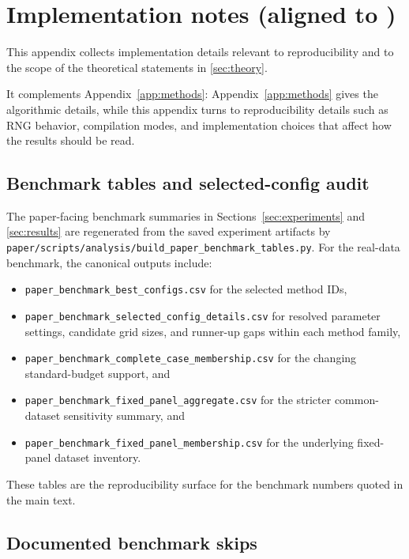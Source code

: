 \section{Implementation notes (aligned to \citrees)}
\label{app:implementation}

This appendix collects implementation details relevant to reproducibility and
to the scope of the theoretical statements in \cref{sec:theory}.

It complements Appendix~\ref{app:methods}: Appendix~\ref{app:methods} gives
the algorithmic details, while this appendix turns to reproducibility
details such as RNG behavior, compilation modes, and implementation choices
that affect how the results should be read.

\subsection{Benchmark tables and selected-config audit}

The paper-facing benchmark summaries in Sections~\ref{sec:experiments} and
\ref{sec:results} are regenerated from the saved experiment artifacts by
\texttt{paper/scripts/analysis/build\_paper\_benchmark\_tables.py}. For the
real-data benchmark, the canonical outputs include:
\begin{itemize}
  \item \texttt{paper\_benchmark\_best\_configs.csv} for the selected method IDs,
  \item \texttt{paper\_benchmark\_selected\_config\_details.csv} for resolved
    parameter settings, candidate grid sizes, and runner-up gaps within each
    method family,
  \item \texttt{paper\_benchmark\_complete\_case\_membership.csv} for the
    changing standard-budget support, and
  \item \texttt{paper\_benchmark\_fixed\_panel\_aggregate.csv} for the stricter
    common-dataset sensitivity summary, and
  \item \texttt{paper\_benchmark\_fixed\_panel\_membership.csv} for the
    underlying fixed-panel dataset inventory.
\end{itemize}
These tables are the reproducibility surface for the benchmark numbers quoted
in the main text.

\subsection{Documented benchmark skips}
\label{app:implementation-skips}

